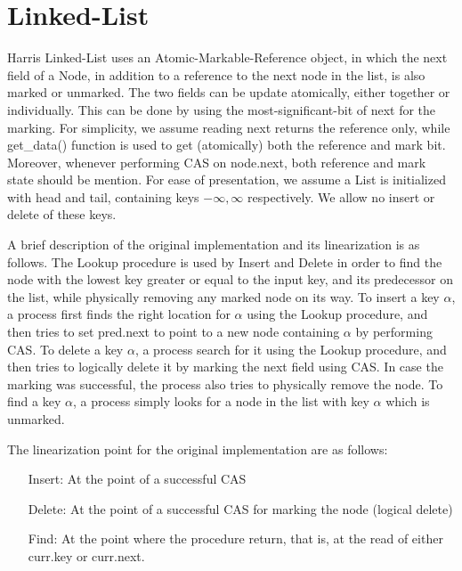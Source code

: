 \section{Linked-List}

Harris Linked-List uses an Atomic-Markable-Reference object, in which the next field of a Node, in addition to a reference to the next node in the list, is also marked or unmarked. The two fields can be update atomically, either together or individually. This can be done by using the most-significant-bit of next for the marking. For simplicity, we assume reading next returns the reference only, while get\_data() function is used to get (atomically) both the reference and mark bit. Moreover, whenever performing CAS on node.next, both reference and mark state should be mention.
For ease of presentation, we assume a List is initialized with head and tail, containing keys $-\infty, \infty$ respectively. We allow no insert or delete of these keys.


A brief description of the original implementation and its linearization is as follows. The Lookup procedure is used by Insert and Delete in order to find the node with the lowest key greater or equal to the input key, and its predecessor on the list, while physically removing any marked node on its way. To insert a key $\alpha$, a process first finds the right location for $\alpha$ using the Lookup procedure, and then tries to set pred.next to point to a new node containing $\alpha$ by performing CAS. To delete a key $\alpha$, a process search for it using the Lookup procedure, and then tries to logically delete it by marking the next field using CAS. In case the marking was successful, the process also tries to physically remove the node. To find a key $\alpha$, a process simply looks for a node in the list with key $\alpha$ which is unmarked.

The linearization point for the original implementation are as follows:
\begin{itemize}
	\item [Insert:] At the point of a successful CAS
	\item [Delete:] At the point of a successful CAS for marking the node (logical delete)
	\item [Find:] At the point where the procedure return, that is, at the read of either curr.key or curr.next.
\end{itemize}

